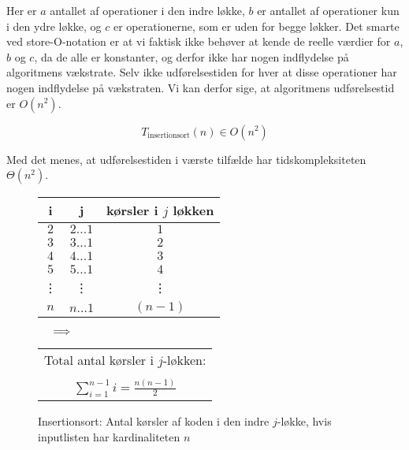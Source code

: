 Her er $a$ antallet af operationer i den indre løkke, $b$ er antallet af operationer kun i den ydre løkke, og $c$ er operationerne, som er uden for begge løkker. Det smarte ved store-O-notation er at vi faktisk ikke behøver at kende de reelle værdier for $a$, $b$ og $c$, da de alle er konstanter, og derfor ikke har nogen indflydelse på algoritmens vækstrate. Selv ikke udførelsestiden for hver at disse operationer har nogen indflydelse på vækstraten. Vi kan derfor sige, at algoritmens udførelsestid er $O(n^2)$.

$$T_{\text{insertionsort}}(n) \in O(n^2)$$

Med det menes, at udførelsestiden i værste tilfælde har tidskompleksiteten $\Theta (n^2)$.


\begin{figure}[b]
	\begin{center}
		\padtable
		\begin{tabular}{ c|c|c }
			i & j & kørsler i $j$ løkken\\
			\hline
			$2$ & $2 \dots 1$ & $1$\\
			$3$ & $3 \dots 1$ & $2$\\
			$4$ & $4 \dots 1$ & $3$\\
			$5$ & $5 \dots 1$ & $4$\\
			\vdots & \vdots & \vdots\\
			$n$ & $n \dots 1$ & $(n-1)$\\
		\end{tabular}
		$\:\:\:\:\:\: \Longrightarrow \:\:\:\:\:\: $	
		\begin{tabular}{c}
			Total antal kørsler i $j$-løkken:\\
			\vspace{-4mm}
			\\
			$\displaystyle\sum_{i=1}^{n-1}i=\frac{n(n-1)}{2}$
		\end{tabular}
	\end{center}
	\caption{Insertionsort: Antal kørsler af koden i den indre $j$-løkke, hvis inputlisten har kardinaliteten $n$}
	\label{fig:Insertionsort Operationer i løkker}
\end{figure}


